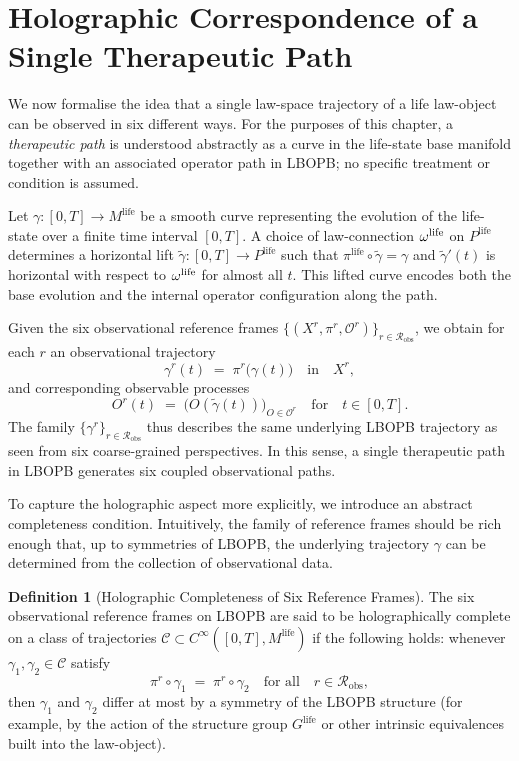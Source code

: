 \documentclass[11pt]{book}
\theoremstyle{plain}
\theoremstyle{definition}
\newtheorem{definition}[theorem]{Definition}
\theoremstyle{remark}
\begin{document}
\section{Holographic Correspondence of a Single Therapeutic Path}


We now formalise the idea that a single law-space trajectory of a life
law-object can be observed in six different ways. For the purposes of
this chapter, a \emph{therapeutic path} is understood abstractly as a
curve in the life-state base manifold together with an associated
operator path in LBOPB; no specific treatment or condition is assumed.

Let $\gamma \colon [0,T] \to M^{\mathrm{life}}$ be a smooth curve
representing the evolution of the life-state over a finite time
interval $[0,T]$. A choice of law-connection
$\omega^{\mathrm{life}}$ on $P^{\mathrm{life}}$ determines a horizontal
lift $\widetilde{\gamma} \colon [0,T] \to P^{\mathrm{life}}$ such that
$\pi^{\mathrm{life}} \circ \widetilde{\gamma} = \gamma$ and
$\widetilde{\gamma}'(t)$ is horizontal with respect to
$\omega^{\mathrm{life}}$ for almost all $t$. This lifted curve encodes
both the base evolution and the internal operator configuration along
the path.

Given the six observational reference frames
$\{(X^{r}, \pi^{r}, \mathcal{O}^{r})\}_{r \in \mathcal{R}_{\mathrm{obs}}}$,
we obtain for each $r$ an observational trajectory
\[
  \gamma^{r}(t) \;=\; \pi^{r}\bigl(\gamma(t)\bigr)
  \quad\text{in}\quad X^{r},
\]
and corresponding observable processes
\[
  O^{r}(t) \;=\; \bigl( O(\widetilde{\gamma}(t)) \bigr)_{O \in \mathcal{O}^{r}}
  \quad\text{for}\quad t \in [0,T].
\]
The family $\{\gamma^{r}\}_{r \in \mathcal{R}_{\mathrm{obs}}}$ thus
describes the same underlying LBOPB trajectory as seen from six
coarse-grained perspectives. In this sense, a single therapeutic path
in LBOPB generates six coupled observational paths.

To capture the holographic aspect more explicitly, we introduce an
abstract completeness condition. Intuitively, the family of reference
frames should be rich enough that, up to symmetries of LBOPB, the
underlying trajectory $\gamma$ can be determined from the collection
of observational data.

\begin{definition}[Holographic Completeness of Six Reference Frames]
The six observational reference frames on LBOPB are said to be
holographically complete on a class of trajectories
$\mathcal{C} \subset C^{\infty}([0,T], M^{\mathrm{life}})$ if the
following holds: whenever
$\gamma_{1}, \gamma_{2} \in \mathcal{C}$ satisfy
\[
  \pi^{r} \circ \gamma_{1} \;=\; \pi^{r} \circ \gamma_{2}
  \quad\text{for all}\quad r \in \mathcal{R}_{\mathrm{obs}},
\]
then $\gamma_{1}$ and $\gamma_{2}$ differ at most by a symmetry of the
LBOPB structure (for example, by the action of the structure group
$G^{\mathrm{life}}$ or other intrinsic equivalences built into the
law-object).
\end{definition}
\end{document}
